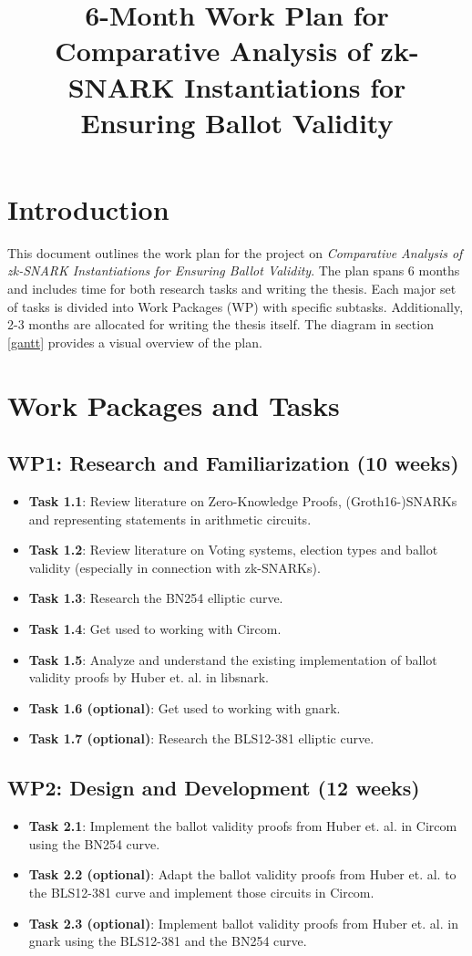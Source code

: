 \documentclass{article}
\title{6-Month Work Plan for Comparative Analysis of zk-SNARK
Instantiations for Ensuring Ballot Validity}
\author{}
\date{}
\begin{document}
\maketitle

\section{Introduction}
This document outlines the work plan for the project on \textit{Comparative Analysis of zk-SNARK
Instantiations for Ensuring Ballot Validity}. 
The plan spans 6 months and includes time for both research tasks and writing the thesis. 
Each major set of tasks is divided into Work Packages (WP) with specific subtasks. 
Additionally, 2-3 months are allocated for writing the thesis itself. 
The diagram in section \ref{gantt} provides a visual overview of the plan.

\section{Work Packages and Tasks}

\subsection*{WP1: Research and Familiarization (10 weeks)}
\begin{itemize}
    \item \textbf{Task 1.1}: Review literature on Zero-Knowledge Proofs, (Groth16-)SNARKs and representing statements in arithmetic circuits.
    \item \textbf{Task 1.2}: Review literature on Voting systems, election types and ballot validity (especially in connection with zk-SNARKs).
    \item \textbf{Task 1.3}: Research the BN254 elliptic curve.
    \item \textbf{Task 1.4}: Get used to working with Circom.
    \item \textbf{Task 1.5}: Analyze and understand the existing implementation of ballot validity proofs by Huber et. al. in libsnark.
    \item \textbf{Task 1.6 (optional)}: Get used to working with gnark.
    \item \textbf{Task 1.7 (optional)}: Research the BLS12-381 elliptic curve.
\end{itemize}

\subsection*{WP2: Design and Development (12 weeks)}
\begin{itemize}
    \item \textbf{Task 2.1}: Implement the ballot validity proofs from Huber et. al. in Circom using the BN254 curve.
    \item \textbf{Task 2.2 (optional)}: Adapt the ballot validity proofs from Huber et. al. to the BLS12-381 curve and implement those circuits in Circom.
    \item \textbf{Task 2.3 (optional)}: Implement ballot validity proofs from Huber et. al. in gnark using the BLS12-381 and the BN254 curve.
\end{itemize}
\end{document}
